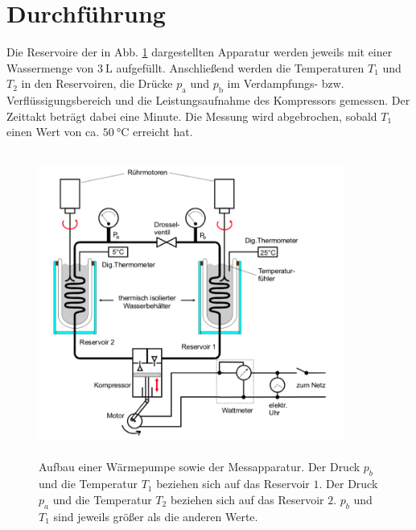 \section{Durchführung}
\label{sec:Durchführung}

Die Reservoire der in Abb. \ref{fig:aufbau2} dargestellten Apparatur werden jeweils mit einer Wassermenge von 
$\SI{3}{\liter}$ aufgefüllt. Anschließend werden die Temperaturen $T_1$ und $T_\text{2}$ in den 
Reservoiren, die Drücke $p_\text{a}$ und $p_\text{b}$ im Verdampfungs- bzw. Verflüssigungsbereich und 
die Leistungsaufnahme des Kompressors gemessen. Der Zeittakt beträgt dabei eine Minute. 
Die Messung wird abgebrochen, sobald $T_1$ einen Wert von ca. $\SI{50}{\degreeCelsius}$ 
erreicht hat. 
\begin{figure}
    \centering
    \includegraphics[width=10cm, height=10cm]{build/2.png}
    \caption{Aufbau einer Wärmepumpe sowie der Messapparatur.
    Der Druck $p_b$ und die Temperatur
    $T_1$ beziehen sich auf das Reservoir $\num{1}$. Der Druck $p_a$ und die Temperatur
    $T_2$ beziehen sich auf das Reservoir $\num{2}$. $p_b$ und $T_1$ sind jeweils
    größer als die anderen Werte.}%
    \label{fig:aufbau2}
\end{figure}
